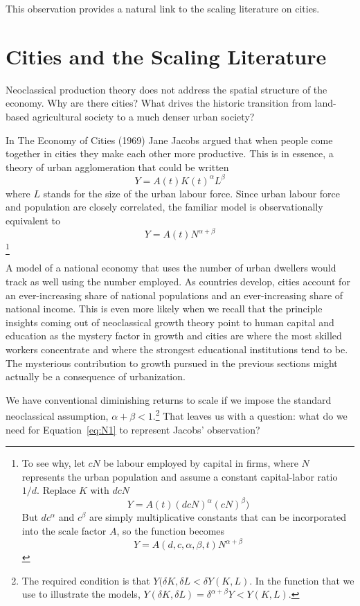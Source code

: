 This observation provides a natural link to the scaling literature on cities.


\section{Cities and the Scaling Literature}
Neoclassical production theory does not address the spatial structure of the economy. Why are there cities? What drives the historic transition from land-based agricultural society to a much denser urban society? 

In The Economy of Cities (1969) Jane Jacobs argued that when people come together in cities they make each other more productive. This is in essence, a theory of urban agglomeration that could be written
\begin{equation}\label{eq:LtoN}
Y = A(t) K(t)^\alpha L^\beta 
\end{equation}
where $L$ stands for the size of the urban labour force. Since urban labour force and population are closely correlated, the familiar model is  observationally equivalent to
\begin{equation}\label{eq:N2}
Y = A(t)N^{\alpha+\beta}
\end{equation}
\footnote{ To see why, let  $cN$ be labour employed by capital in firms, where $N$ represents the urban population and  assume a constant capital-labor ratio $1/d$. Replace $K$ with $dcN$
\[Y = A(t) (dcN)^\alpha (cN)^\beta) \]
But  $dc^\alpha$ and $c^\beta$  are simply  multiplicative constants that can be incorporated into the scale factor $A$, so  the function becomes 
\[Y = A(d, c,\alpha, \beta, t)N^{\alpha+\beta}\]
}

A model of a national economy that uses the number of urban dwellers would track as well using the number employed. As countries develop, cities account for an ever-increasing share of  national populations and an ever-increasing share of national income.  This is  even more likely when we recall that the principle insights coming out of neoclassical growth theory point to human capital and education as the mystery factor in growth and cities are where the most skilled workers concentrate and where the strongest educational institutions tend to be. The mysterious contribution to growth pursued in the previous sections might  actually be a consequence of urbanization.

We have conventional diminishing returns to scale  if we impose the standard neoclassical assumption, 
$\alpha +\beta <1 $.\footnote{
The required condition is that 
$Y(\delta K,\delta L< \delta Y(K,L)$. 
In the function that we use to illustrate the models, 
$Y(\delta K,\delta L)= \delta^{\alpha +\beta}Y < Y(K,L)$.} 
That leaves us with a question: what do we need for Equation~\ref{eq:N1} to represent Jacobs' observation?  

